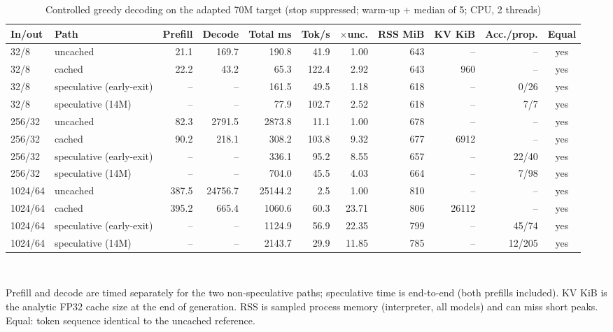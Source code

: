 \begin{table}[t]\centering\caption{Controlled greedy decoding on the adapted 70M target (stop suppressed; warm-up + median of 5; CPU, 2 threads)}\label{tab:runtime}\footnotesize
\begin{tabular}{llrrrrrrrrc}
\hline
In/out & Path & Prefill & Decode & Total ms & Tok/s & $\times$unc. & RSS MiB & KV KiB & Acc./prop. & Equal\\\hline
32/8 & uncached & 21.1 & 169.7 & 190.8 & 41.9 & 1.00 & 643 & -- & -- & yes\\
32/8 & cached & 22.2 & 43.2 & 65.3 & 122.4 & 2.92 & 643 & 960 & -- & yes\\
32/8 & speculative (early-exit) & -- & -- & 161.5 & 49.5 & 1.18 & 618 & -- & 0/26 & yes\\
32/8 & speculative (14M) & -- & -- & 77.9 & 102.7 & 2.52 & 618 & -- & 7/7 & yes\\
256/32 & uncached & 82.3 & 2791.5 & 2873.8 & 11.1 & 1.00 & 678 & -- & -- & yes\\
256/32 & cached & 90.2 & 218.1 & 308.2 & 103.8 & 9.32 & 677 & 6912 & -- & yes\\
256/32 & speculative (early-exit) & -- & -- & 336.1 & 95.2 & 8.55 & 657 & -- & 22/40 & yes\\
256/32 & speculative (14M) & -- & -- & 704.0 & 45.5 & 4.03 & 664 & -- & 7/98 & yes\\
1024/64 & uncached & 387.5 & 24756.7 & 25144.2 & 2.5 & 1.00 & 810 & -- & -- & yes\\
1024/64 & cached & 395.2 & 665.4 & 1060.6 & 60.3 & 23.71 & 806 & 26112 & -- & yes\\
1024/64 & speculative (early-exit) & -- & -- & 1124.9 & 56.9 & 22.35 & 799 & -- & 45/74 & yes\\
1024/64 & speculative (14M) & -- & -- & 2143.7 & 29.9 & 11.85 & 785 & -- & 12/205 & yes\\
\hline\end{tabular}
\\[2pt]\parbox{0.95\linewidth}{\scriptsize Prefill and decode are timed separately for the two non-speculative paths; speculative time is end-to-end (both prefills included). KV KiB is the analytic FP32 cache size at the end of generation. RSS is sampled process memory (interpreter, all models) and can miss short peaks. Equal: token sequence identical to the uncached reference.}
\end{table}

